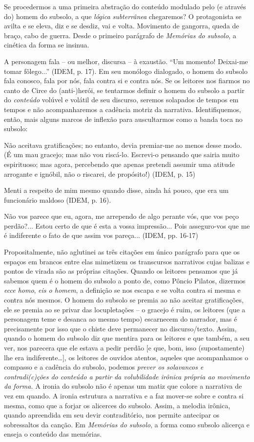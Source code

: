 Se procedermos a uma primeira abstração do conteúdo modulado pelo (e
através do) homem do subsolo, a que \emph{lógica} \emph{subterrânea}
chegaremos? O protagonista se avilta e se eleva, diz e se desdiz, vai e
volta. Movimento de gangorra, queda de braço, cabo de guerra. Desde o
primeiro parágrafo de \emph{Memórias do subsolo}, a cinética da forma se
insinua.

A personagem fala -- ou melhor, discursa -- à exaustão. ``Um momento!
Deixai-me tomar fôlego...'' (IDEM, p. 17). Em seu monólogo dialogado, o
homem do subsolo fala conosco, fala por nós, fala contra si e contra
nós. Se os leitores nos fiarmos no canto de Circe do (anti-)herói, se
tentarmos definir o homem do subsolo a partir do \emph{conteúdo} volúvel
e volátil de seu discurso, seremos solapados de tempos em tempos e não
acompanharemos a cadência motriz da narrativa. Identifiquemos, então,
mais alguns marcos de inflexão para auscultarmos como a banda toca no
subsolo:

Não aceitava gratificações; no entanto, devia premiar-me ao menos desse
modo. (É um mau gracejo; mas não vou riscá-lo. Escrevi-o pensando que
sairia muito espirituoso; mas agora, percebendo que apenas pretendi
assumir uma atitude arrogante e ignóbil, não o riscarei, de propósito!)
(IDEM, p. 15)

Menti a respeito de mim mesmo quando disse, ainda há pouco, que era um
funcionário maldoso (IDEM, p. 16).

Não vos parece que eu, agora, me arrependo de algo perante vós, que vos
peço perdão?... Estou certo de que é esta a vossa impressão... Pois
asseguro-vos que me é indiferente o fato de que assim vos pareça...
(IDEM, pp. 16-17)

Propositalmente, não aglutinei as três citações em único parágrafo para
que os espaços em brancos entre elas mimetizem os transcursos narrativos
cujas balizas e pontos de virada são as próprias citações. Quando os
leitores pensamos que já sabemos quem é o homem do subsolo a ponto de,
como Pôncio Pilatos, dizermos \emph{ecce homo}, \emph{eis o homem}, a
definição se nos escapa e se volta contra si mesma e contra nós mesmos.
O homem do subsolo se premia ao não aceitar gratificações, ele se premia
ao se privar das locupletações -- o gracejo é ruim, os leitores (que a
personagem teme e desanca ao mesmo tempo) escarnecem do narrador, mas é
precisamente por isso que o chiste deve permanecer no discurso/texto.
Assim, quando o homem do subsolo diz que mentira para os leitores e que
também, a seu ver, nos parecera que ele estava a pedir perdão {[}e que,
bom, isso (supostamente) lhe era indiferente\ldots{}{]}, os leitores de
ouvidos atentos, aqueles que acompanhamos o compasso e a cadência do
subsolo, podemos \emph{prever os solavancos e contradi(c)ções do
conteúdo a partir da volubilidade irônica própria ao movimento da
forma.} A ironia do subsolo não é apenas um matiz que colore a narrativa
de vez em quando. A ironia estrutura a narrativa e a faz mover-se sobre
e contra si mesma, como que a forjar os alicerces do subsolo. Assim, a
melodia irônica, quando apreendida em seu devir contraditório, nos
permite antecipar os sobressaltos da canção. Em \emph{Memórias do
subsolo}, a forma como subsolo alicerça e enseja o conteúdo das
memórias.

